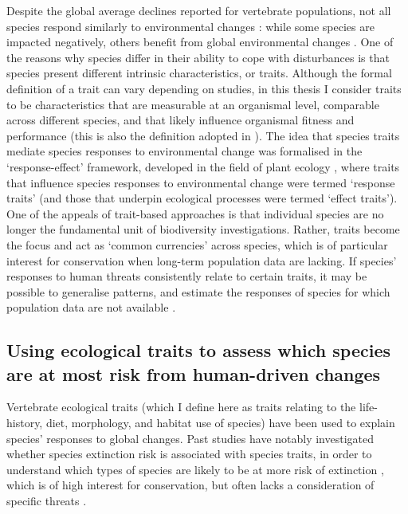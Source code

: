 Despite the global average declines reported for vertebrate populations, not all species respond similarly to environmental changes \citep{Dornelas2019, Leung2020}: while some species are impacted negatively, others benefit from global environmental changes \citep{Thomas2013, Newbold2018a}. One of the reasons why species differ in their ability to cope with disturbances is that species present different intrinsic characteristics, or traits. Although the formal definition of a trait can vary depending on studies, in this thesis I consider traits to be characteristics that are measurable at an organismal level, comparable across different species, and that likely influence organismal fitness and performance (this is also the definition adopted in \citet{McGill2006}). The idea that species traits mediate species responses to environmental change was formalised in the `response-effect' framework, developed in the field of plant ecology \citep{Lavorel2002a}, where traits that influence species responses to environmental change were termed `response traits' (and those that underpin ecological processes were termed `effect traits'). One of the appeals of trait-based approaches is that individual species are no longer the fundamental unit of biodiversity investigations. Rather, traits become the focus and act as `common currencies' across species, which is of particular interest for conservation when long-term population data are lacking. If species’ responses to human threats consistently relate to certain traits, it may be possible to generalise patterns, and estimate the responses of species for which population data are not available \citep{Verberk2013}. 

\subsection{Using ecological traits to assess which species are at most risk from human-driven changes}

Vertebrate ecological traits (which I define here as traits relating to the life-history, diet, morphology, and habitat use of species) have been used to explain species' responses to global changes. Past studies have notably investigated whether species extinction risk is associated with species traits, in order to understand which types of species are likely to be at more risk of extinction \citep{Lebreton2011, Ripple2017, Chichorro2019}, which is of high interest for conservation, but often lacks a consideration of specific threats \citep{GonzalezSuarez2013}. 

